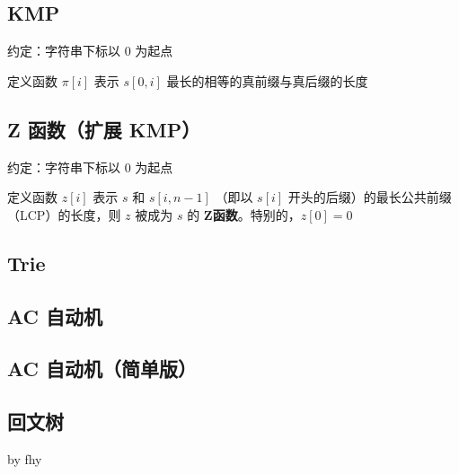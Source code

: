 \documentclass[12pt]{article}
\begin{document}
\subsection{KMP}

约定：字符串下标以 $0$ 为起点

定义函数 $\pi[i]$ 表示 $s[0,i]$ 最长的相等的真前缀与真后缀的长度



\subsection{Z 函数（扩展 KMP）}

约定：字符串下标以 $0$ 为起点

定义函数 $z[i]$ 表示 $s$ 和 $s[i,n-1]$ （即以 $s[i]$ 开头的后缀）的最长公共前缀（LCP）的长度，则 $z$ 被成为 $s$ 的 \textbf{Z函数}。特别的，$z[0]=0$



\newpage

\subsection{Trie}



\newpage

\subsection{AC 自动机}



\newpage

\subsection{AC 自动机（简单版）}



\newpage

\subsection{回文树}

by fhy


\end{document}
